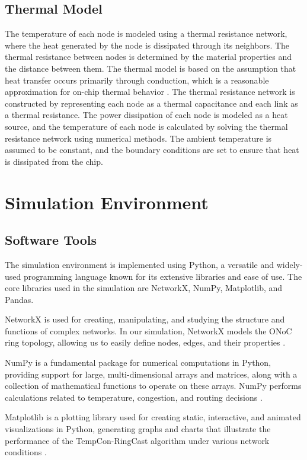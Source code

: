 \documentclass[12pt]{article}
\begin{document}
\subsection{Thermal Model}
The temperature of each node is modeled using a thermal resistance network, where the heat generated by the node is dissipated through its neighbors. The thermal resistance between nodes is determined by the material properties and the distance between them. The thermal model is based on the assumption that heat transfer occurs primarily through conduction, which is a reasonable approximation for on-chip thermal behavior \cite{skadron2003temperature}. The thermal resistance network is constructed by representing each node as a thermal capacitance and each link as a thermal resistance. The power dissipation of each node is modeled as a heat source, and the temperature of each node is calculated by solving the thermal resistance network using numerical methods. The ambient temperature is assumed to be constant, and the boundary conditions are set to ensure that heat is dissipated from the chip.

\section{Simulation Environment}
\subsection{Software Tools}
The simulation environment is implemented using Python, a versatile and widely-used programming language known for its extensive libraries and ease of use. The core libraries used in the simulation are NetworkX, NumPy, Matplotlib, and Pandas.

NetworkX is used for creating, manipulating, and studying the structure and functions of complex networks. In our simulation, NetworkX models the ONoC ring topology, allowing us to easily define nodes, edges, and their properties \cite{hagberg2008exploring}.

NumPy is a fundamental package for numerical computations in Python, providing support for large, multi-dimensional arrays and matrices, along with a collection of mathematical functions to operate on these arrays. NumPy performs calculations related to temperature, congestion, and routing decisions \cite{walt2011numpy}.

Matplotlib is a plotting library used for creating static, interactive, and animated visualizations in Python, generating graphs and charts that illustrate the performance of the TempCon-RingCast algorithm under various network conditions \cite{hunter2007matplotlib}.
\end{document}
